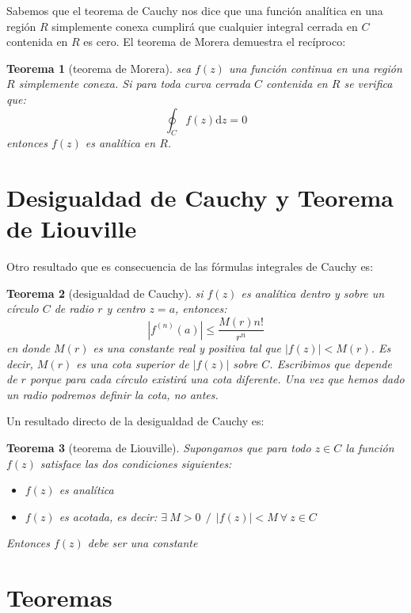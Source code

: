 \documentclass[12pt,a4paper]{book}
\newcommand{\D}{\mathrm{d}}
\newtheorem{theorem}{Teorema}[section]
\begin{document}
Sabemos que el teorema de Cauchy nos dice que una función analítica en una región $R$ simplemente conexa cumplirá que cualquier integral cerrada en $C$ contenida en $R$ es cero. El teorema de Morera demuestra el recíproco:

\begin{theorem}[teorema de Morera]
sea $f(z)$ una función continua en una región $R$ simplemente conexa. Si para toda curva cerrada $C$ contenida en $R$ se verifica que: 
$$ \oint_C f(z) \D z = 0 $$
entonces $f(z)$ es analítica en $R$.
\end{theorem}

\section{Desigualdad de Cauchy y Teorema de Liouville}

Otro resultado que es consecuencia de las fórmulas integrales de Cauchy es:

\begin{theorem}[desigualdad de Cauchy]
si $f(z)$ es analítica dentro y sobre un círculo $C$ de radio $r$ y centro $z=a$, entonces:
$$ \left|  f^{(n)}(a) \right| \leq \frac{M(r) n!}{r^n}$$
en donde $M(r)$ es una constante real y positiva tal que $|f(z)|<M(r)$. Es decir, $M(r)$ es una cota superior de $|f(z)|$ sobre $C$. Escribimos que depende de $r$ porque para cada círculo existirá una cota diferente. Una vez que hemos dado un radio podremos definir la cota, no antes.
\end{theorem}

Un resultado directo de la desigualdad de Cauchy es:

\begin{theorem}[teorema de Liouville]
Supongamos que para todo $z \in C$ la función $f(z)$ satisface las dos condiciones siguientes:

\begin{itemize}
\item $f(z)$ es analítica 
\item $f(z)$ es acotada, es decir:   $\exists \ M > 0 \ \ / \ \ |f(z)|<M  \  \forall  \ z \in C$
\end{itemize}
Entonces $f(z)$ debe ser una constante

\end{theorem}

\section{Teoremas}
\end{document}
